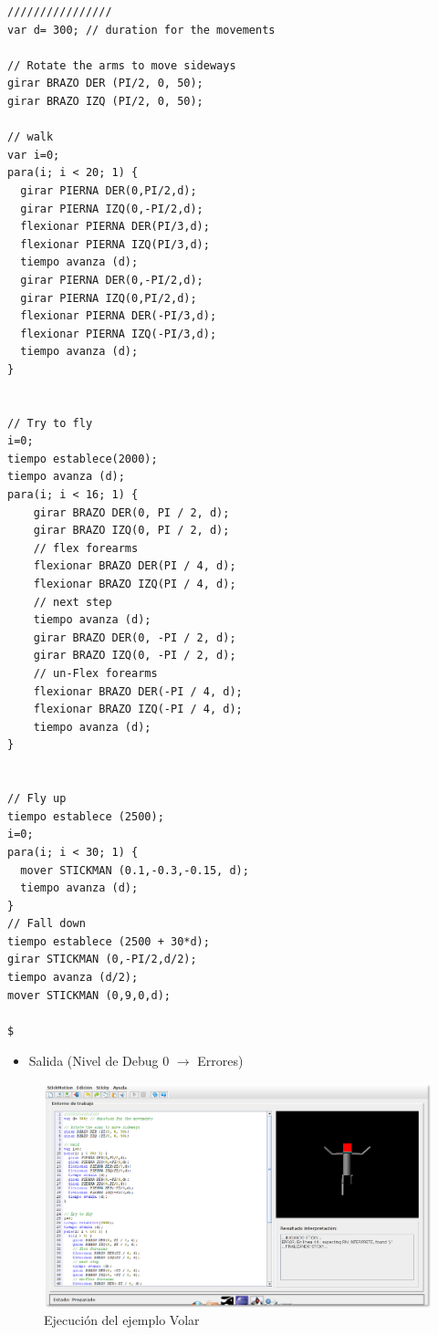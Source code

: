 \documentclass[a4paper, 12pt]{book}
\begin{document}
\begin{itemize}
  
  
\begin{verbatim}
////////////////
var d= 300; // duration for the movements

// Rotate the arms to move sideways
girar BRAZO DER (PI/2, 0, 50);
girar BRAZO IZQ (PI/2, 0, 50);

// walk
var i=0;
para(i; i < 20; 1) {  
  girar PIERNA DER(0,PI/2,d);
  girar PIERNA IZQ(0,-PI/2,d);
  flexionar PIERNA DER(PI/3,d);
  flexionar PIERNA IZQ(PI/3,d);
  tiempo avanza (d);
  girar PIERNA DER(0,-PI/2,d);
  girar PIERNA IZQ(0,PI/2,d);
  flexionar PIERNA DER(-PI/3,d);
  flexionar PIERNA IZQ(-PI/3,d);
  tiempo avanza (d);  
}


// Try to fly
i=0;
tiempo establece(2000);
tiempo avanza (d);
para(i; i < 16; 1) {    
    girar BRAZO DER(0, PI / 2, d);
    girar BRAZO IZQ(0, PI / 2, d);
    // flex forearms
    flexionar BRAZO DER(PI / 4, d);
    flexionar BRAZO IZQ(PI / 4, d);
    // next step
    tiempo avanza (d);
    girar BRAZO DER(0, -PI / 2, d);
    girar BRAZO IZQ(0, -PI / 2, d);
    // un-Flex forearms
    flexionar BRAZO DER(-PI / 4, d);
    flexionar BRAZO IZQ(-PI / 4, d);
    tiempo avanza (d);
} 


// Fly up
tiempo establece (2500);
i=0;
para(i; i < 30; 1) {
  mover STICKMAN (0.1,-0.3,-0.15, d);
  tiempo avanza (d);
}
// Fall down
tiempo establece (2500 + 30*d);
girar STICKMAN (0,-PI/2,d/2);
tiempo avanza (d/2);
mover STICKMAN (0,9,0,d);

$
\end{verbatim}
  
  
  
  \begin{itemize}
\item Salida (Nivel de Debug 0 $\rightarrow$ Errores)
\end{itemize}
\begin{figure}[htb]
  \centerline{\includegraphics[width=\textwidth]{./imagenes/volar1.png}}
  \caption{Ejecución del ejemplo Volar}
\end{figure}



\end{itemize}
\end{document}
